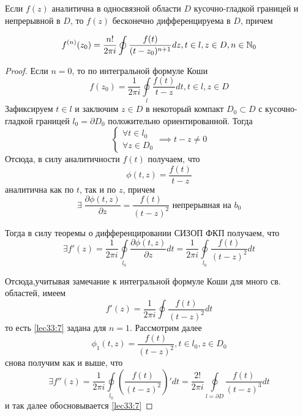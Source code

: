 \documentclass[../../main.tex]{subfiles}
\begin{document}
	
\begin{thm}
	Если $f(z)$ аналитична в односвязной области $D$ 
	кусочно-гладкой границей и непрерывной в $D$, то 
	$f(z)$ бесконечно дифференцируема в $D$, причем 
	
	\begin{equation}
	\label{lec33:7}
	f^{(n)}(z_0) = \frac{n!}{2\pi i} \oint
	\frac{f(t)}{(t-z_0)^{n+1}} dz,
	t \in l, z \in D, n \in \mathbb{N}_0
	\end{equation}
	
\end{thm}

\begin{proof}
	Если $n=0$, то по интегральной формуле Коши
	\[
	f(z_0) = \frac{1}{2\pi i} \oint \limits_l
	\frac{f(t)}{t-z} dt, t \in l, z \in D
	\]
	Зафиксируем $t \in l$ и заключим $z \in D$ в
	некоторый компакт $D_0 \subset D$ с 
	кусочно-гладкой границей $l_0 = \partial D_0$
	положительно ориентированной. Тогда
	\[
	\begin{cases}
	\forall t \in l_0 \\
	\forall z \in D_0
	\end{cases} \implies t - z \neq 0
	\]
	Отсюда, в силу аналитичности $f(t)$ получаем, что
	\begin{equation}
	\label{lec33:9}
	\phi(t, z) = \frac{f(t)}{t-z} 
	\end{equation}
	аналитична как по $t$, так и по $z$, причем
	\[
	\exists\; \frac{\partial \phi(t, z)}{\partial z}
	= \frac{f(t)}{(t-z)^2}
	\text{ непрерывная на } b_0
	\]
	
	Тогда в силу теоремы о дифференцировании СИЗОП ФКП
	получаем, что 
	\begin{equation}
	\label{lec33:10}
	\exists f'(z) = \frac{1}{2\pi i} \oint\limits_{l_0}
	\frac{\partial \phi(t, z)}{\partial z} dt = 
	\frac{1}{2\pi i} \oint\limits_{l_0}\frac{f(t)}{(t-z)^2} 
	dt 
	\end{equation}
	
	Отсюда,учитывая замечание к интегральной формуле Коши 
	для много св. областей, имеем 
	\[
	f'(z) = \frac{1}{2\pi i} \oint \frac{f(t)}{(t-z)^2} dt
	\]
	то есть \eqref{lec33:7} задана для $n = 1$.
	Рассмотрим далее 
	\[
	\phi_1(t, z) = \frac{f(t)}{(t-z)^2}, t \in l_0,
	z \in D_0
	\]
	снова получим как и выше, что 
	\[
	\exists f''(z) = \frac{1}{2\pi i} \oint\limits_{l_0}
	\left( \frac{f(t)}{(t-z)^2} \right)' dt =
	\frac{2!}{2\pi i} \oint\limits_{l = \partial D}
	\frac{f(t)}{(t-z)^3} dt 
	\]
	и так далее обосновывается \eqref{lec33:7}
\end{proof}
\end{document}
